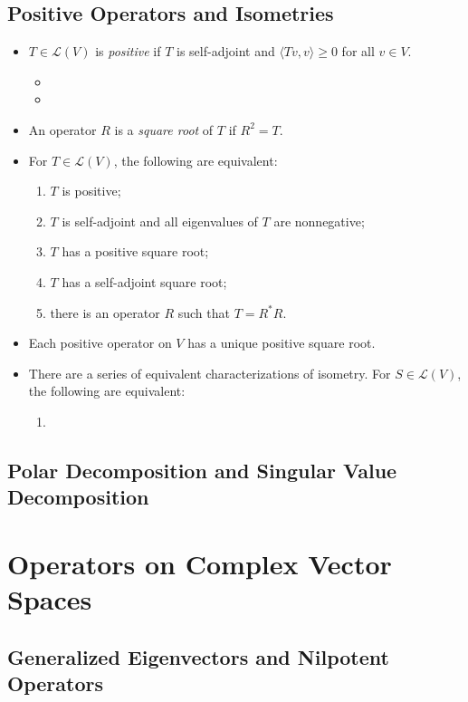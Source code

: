 \documentclass{article}
\newcommand{\inp}[2]{\langle #1, #2 \rangle}
\newcommand{\LV}{\mathcal{L}(V)}
\begin{document}
\subsection{Positive Operators and Isometries}
\begin{itemize}
    \item $T \in \LV$ is \textit{positive} if $T$ is self-adjoint and $\inp{Tv}{v} \geq 0$ for all $v \in V$.
    \begin{itemize}
        \item 
        \item 
    \end{itemize}
    \item An operator $R$ is a \textit{square root} of $T$ if $R^2 = T$.
    \item For $T \in \LV$, the following are equivalent:
    \begin{enumerate}[label=(\alph*)]
        \item $T$ is positive;
        \item $T$ is self-adjoint and all eigenvalues of $T$ are nonnegative;
        \item $T$ has a positive square root;
        \item $T$ has a self-adjoint square root;
        \item there is an operator $R$ such that $T = R^* R$.
    \end{enumerate}
    
    \item Each positive operator on $V$ has a unique positive square root.
    
    \item There are a series of equivalent characterizations of isometry. For $S \in \LV$, the following are equivalent:
    \begin{enumerate}[label=(\alph*)]
    \item 
    \end{enumerate}
\end{itemize}

\subsection{Polar Decomposition and Singular Value Decomposition}


\section{Operators on Complex Vector Spaces}
\subsection{Generalized Eigenvectors and Nilpotent Operators}
\end{document}
